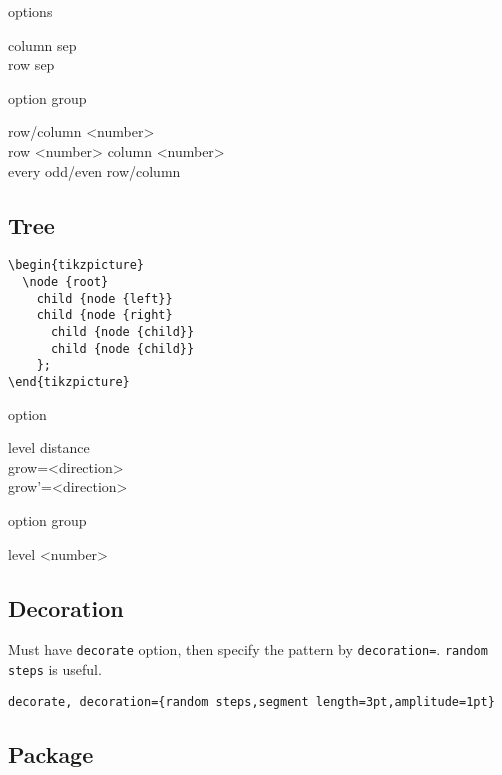 options
\begin{description}
\item [column sep]
\item [row sep]
\end{description}

option group
\begin{description}
\item [row/column <number>]
\item [row <number> column <number>]
\item [every odd/even row/column]
\end{description}


\subsection{Tree}

\begin{lstlisting}
\begin{tikzpicture}
  \node {root}
    child {node {left}}
    child {node {right}
      child {node {child}}
      child {node {child}}
    };
\end{tikzpicture}
\end{lstlisting}

option
\begin{description}
\item [level distance]
\item [grow=<direction>]
\item [grow'=<direction>]
\end{description}

option group
\begin{description}
\item [level <number>]
\end{description}

\subsection{Decoration}
Must have \texttt{decorate} option, then specify the pattern by
\texttt{decoration=}. \texttt{random steps} is useful.

\begin{lstlisting}
decorate, decoration={random steps,segment length=3pt,amplitude=1pt}
\end{lstlisting}


\subsection{Package}
